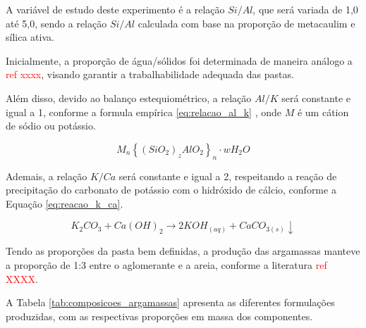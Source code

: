 A variável de estudo deste experimento é a relação $Si/Al$, que será variada de 1,0 até 5,0, sendo a relação $Si/Al$ calculada com base na proporção de metacaulim e sílica ativa.

Inicialmente, a proporção de água/sólidos foi determinada de maneira análogo a \textcolor{red}{ref xxxx}, visando garantir a trabalhabilidade adequada das pastas.

Além disso, devido ao balanço estequiométrico, a relação $Al/K$ será constante e igual a 1, conforme a formula empírica \ref{eq:relacao_al_k} \cite{joseph1991geopolymers}, onde $M$ é um cátion de sódio ou potássio.

\begin{equation}
    \label{eq:relacao_al_k}
    M_n \left\{ \left(SiO_2 \right)_z AlO_2 \right\}_n \cdot wH_2O
\end{equation}

Ademais, a relação $K/Ca$ será constante e igual a 2, respeitando a reação de precipitação do carbonato de potássio com o hidróxido de cálcio, conforme a Equação \ref{eq:reacao_k_ca}.

\begin{equation}
    \label{eq:reacao_k_ca}
    K_2CO_3 + Ca(OH)_2 \rightarrow  2KOH_{(aq)} + CaCO_{3(s)} \downarrow
\end{equation}

Tendo as proporções da pasta bem definidas, a produção das argamassas manteve a proporção de 1:3 entre o aglomerante e a areia, conforme a literatura \textcolor{red}{ref XXXX}.


A Tabela \ref{tab:composicoes_argamassas} apresenta as diferentes formulações produzidas, com as respectivas proporções em massa dos componentes.

